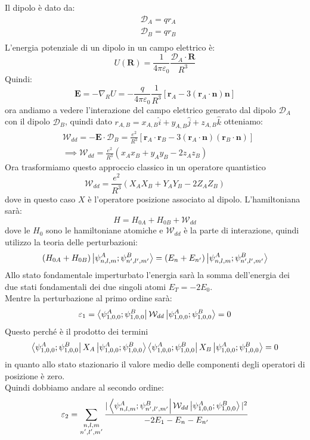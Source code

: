 Il dipolo è dato da:
\[ \begin{split}
    &\mathcal{D}_A = qr_A \\
    &\mathcal{D}_B = qr_B \\
\end{split}\]
L'energia potenziale di un dipolo in un campo elettrico è:
\[ U(\mathbf{R}) = \frac{1}{4\pi\varepsilon_0} \frac{\mathcal{D}_A\cdot \mathbf{R}}{R^3}\]
Quindi:
\[ \mathbf{E} = -\nabla_R U = -\frac{q}{4\pi\varepsilon_0}\frac{1}{R^3}[\mathbf{r}_A-3(\mathbf{r}_A \cdot \mathbf{n})\mathbf{n}]\]
ora andiamo a vedere l'interazione del campo elettrico generato dal dipolo $\mathcal{D}_A$ con il dipolo $\mathcal{D}_B$, quindi dato $r_{A,B} = x_{A,B} \hat{i}+y_{A,B}\hat{j}+z_{A,B}\hat{k}$ otteniamo:
\[
\begin{split}
    &\mathcal{W}_{dd} = - \mathbf{E} \cdot \mathcal{D}_B = \frac{e^2}{R^3}[ \mathbf{r}_A \cdot \mathbf{r}_B - 3(\mathbf{r}_A \cdot \mathbf{n})(\mathbf{r}_B \cdot \mathbf{n})] \\
    & \implies \mathcal{W}_{dd} = \frac{e^2}{R^3}(x_Ax_B + y_Ay_B - 2z_Az_B)
\end{split}
\]
Ora trasformiamo questo approccio classico in un operatore quantistico
\begin{equation}
    \mathcal{W}_{dd} = \frac{e^2}{R^3} (X_AX_B + Y_AY_B -2Z_AZ_B)
    \label{eqn:quantum-wdd}
\end{equation}
dove in questo caso $X$ è l'operatore posizione associato al dipolo. L'hamiltoniana sarà: 
\[H = H_{0A}+H_{0B} + \mathcal{W}_{dd}\]
dove le $H_0$ sono le hamiltoniane atomiche e $\mathcal{W}_{dd}$ è la parte di interazione, quindi utilizzo la teoria delle perturbazioni:
\[(H_{0A}+H_{0B})\ket{\psi_{n,l,m}^A; \psi_{n',l',m'}^B} = (E_n + E_{n'})\ket{\psi_{n,l,m}^A; \psi_{n',l',m'}^B} \]
Allo stato fondamentale imperturbato l'energia sarà la somma dell'energia dei due stati fondamentali dei due singoli atomi $E_T = -2E_0$.\\
Mentre la perturbazione al primo ordine sarà:
\[ \varepsilon_1 = \bra{\psi_{1,0,0}^A;\psi_{1,0,0}^B}\mathcal{W}_{dd}\ket{\psi_{1,0,0}^A;\psi_{1,0,0}^B} = 0\]
Questo perché è il prodotto dei termini \\
\[\bra{\psi_{1,0,0}^A;\psi_{1,0,0}^B} X_A \ket{\psi_{1,0,0}^A;\psi_{1,0,0}^B}\bra{\psi_{1,0,0}^A;\psi_{1,0,0}^B}X_B\ket{\psi_{1,0,0}^A;\psi_{1,0,0}^B} = 0\]
in quanto allo stato stazionario il  valore medio delle componenti degli operatori di posizione è zero.\\
Quindi dobbiamo andare al secondo ordine:
\begin{equation*}
\varepsilon_2 = \sum_{\substack{n,l,m \\ n',l',m'}} \frac{|\bra{\psi_{n,l,m}^A;\psi_{n',l',m'}^B} \mathcal{W}_{dd}\ket{\psi_{1,0,0}^A;\psi_{1,0,0}^B}|^2}{-2E_1-E_n-E_{n'}}
\end{equation*}
